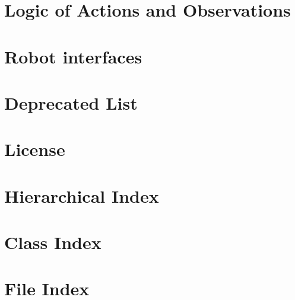 \documentclass[twoside]{book}
\newcommand{\+}{\discretionary{\mbox{\scriptsize$\hookleftarrow$}}{}{}}
\begin{document}
\chapter{Logic of Actions and Observations}
\label{md_docs_timeseries}

\chapter{Robot interfaces}
\label{md_readme}

\chapter{Deprecated List}
\label{deprecated}

\chapter{License}
\label{license}

\chapter{Hierarchical Index}

\chapter{Class Index}

\chapter{File Index}

\end{document}
